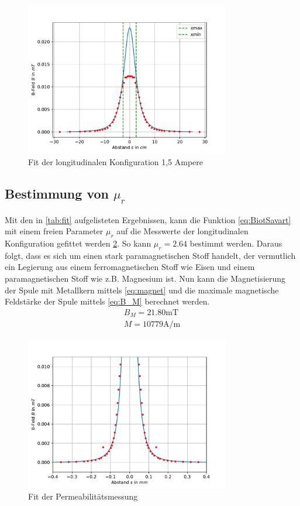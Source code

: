 \documentclass[11pt, a4paper]{article}
\begin{document}
    \begin{figure}
        \centering
        \includegraphics[width=0.8\textwidth]{fit15a.pdf}
        \caption{Fit der longitudinalen Konfiguration 1,5 Ampere}
        \label{fig:longfit15a}
    \end{figure}

    \subsection{Bestimmung von $\mu_r$}
    Mit den in \ref{tab:fit} aufgelisteten Ergebnissen, kann die Funktion \ref{eq:BiotSavart} mit einem freien Parameter $\mu_r$ auf die Messwerte der longitudinalen Konfiguration gefittet werden \ref{fig:murfit}. So kann $\mu_r = 2.64$ bestimmt werden.
    Daraus folgt, dass es sich um einen stark paramagnetischen Stoff handelt, der vermutlich ein Legierung aus einem ferromagnetischen Stoff wie Eisen und einem paramagnetischen Stoff wie z.B. Magnesium ist.
    Nun kann die Magnetisierung der Spule mit Metallkern mittels \ref{eq:magnet} und die maximale magnetische Feldstärke der Spule mittels \ref{eq:B_M} berechnet werden.
   \begin{align}
        B_{M} = 21.80 \si{\milli\tesla} \\
        M = 10779 \si{\ampere\per\metre}
    \end{align}
    \begin{figure}
        \centering
        \includegraphics[width=0.8\textwidth]{mur.pdf}
        \caption{Fit der Permeabilitätsmessung}
        \label{fig:murfit}
    \end{figure}
\end{document}
